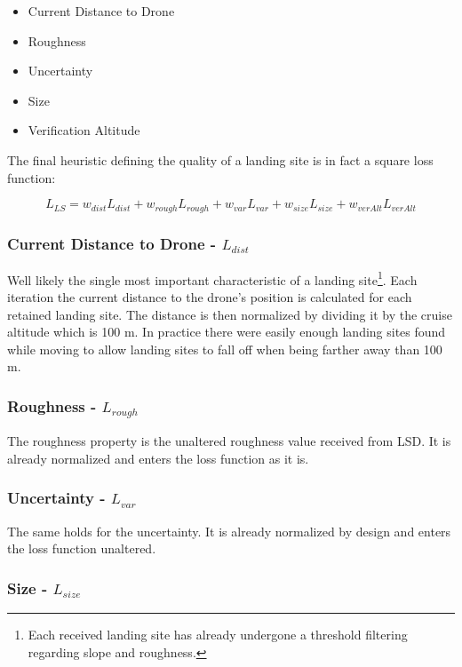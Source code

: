 \begin{itemize}
    \item Current Distance to Drone
    \item Roughness
    \item Uncertainty
    \item Size
    \item Verification Altitude
\end{itemize}

The final heuristic defining the quality of a landing site is in fact a square loss function:

\begin{equation}
    L_{LS} = w_{dist}L_{dist} + w_{rough}L_{rough} + w_{var}L_{var} + w_{size}L_{size} + w_{verAlt}L_{verAlt}
    \label{eq:loss_fct}
\end{equation}

\subsubsection{Current Distance to Drone - $L_{dist}$}
Well likely the single most important characteristic of a landing site\footnote[1]{Each received landing site has already undergone a threshold filtering regarding slope and roughness.}. Each iteration the current distance to the drone's position is calculated for each retained landing site. The distance is then normalized by dividing it by the cruise altitude which is 100 m. In practice there were easily enough landing sites found while moving to allow landing sites to fall off when being farther away than 100 m.

\subsubsection{Roughness - $L_{rough}$}

The roughness property is the unaltered roughness value received from LSD. It is already normalized and enters the loss function as it is. 

\subsubsection{Uncertainty - $L_{var}$}

The same holds for the uncertainty. It is already normalized by design and enters the loss function unaltered.

\subsubsection{Size - $L_{size}$}


